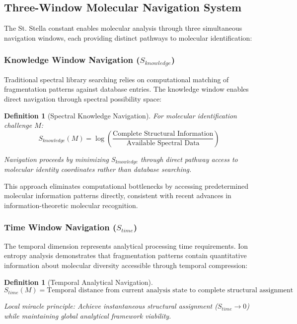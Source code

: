 \documentclass[11pt,a4paper]{article}
\newtheorem{definition}[theorem]{Definition}
\theoremstyle{remark}
\begin{document}
\subsection{Three-Window Molecular Navigation System}

The St. Stella constant enables molecular analysis through three simultaneous navigation windows, each providing distinct pathways to molecular identification:

\subsubsection{Knowledge Window Navigation ($S_{knowledge}$)}

Traditional spectral library searching relies on computational matching of fragmentation patterns against database entries. The knowledge window enables direct navigation through spectral possibility space:

\begin{definition}[Spectral Knowledge Navigation]
For molecular identification challenge $M$:
$$S_{knowledge}(M) = \log\left(\frac{\text{Complete Structural Information}}{\text{Available Spectral Data}}\right)$$

Navigation proceeds by minimizing $S_{knowledge}$ through direct pathway access to molecular identity coordinates rather than database searching.
\end{definition}

This approach eliminates computational bottlenecks by accessing predetermined molecular information patterns directly, consistent with recent advances in information-theoretic molecular recognition.

\subsubsection{Time Window Navigation ($S_{time}$)}

The temporal dimension represents analytical processing time requirements. Ion entropy analysis demonstrates that fragmentation patterns contain quantitative information about molecular diversity accessible through temporal compression:

\begin{definition}[Temporal Analytical Navigation]
$$S_{time}(M) = \text{Temporal distance from current analysis state to complete structural assignment}$$

Local miracle principle: Achieve instantaneous structural assignment ($S_{time} \rightarrow 0$) while maintaining global analytical framework viability.
\end{definition}
\end{document}
